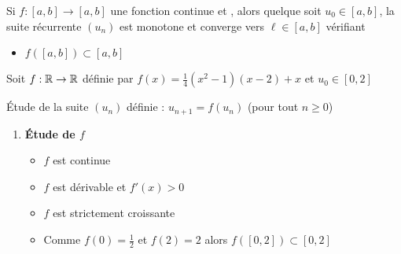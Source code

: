 \begin{frame}


\begin{proposition}
\label{prop:fcroissante}
Si $f : [a,b] \to [a,b]$ une fonction continue et , 
alors quelque soit $u_0 \in [a,b]$, la suite récurrente $(u_n)$ est
monotone et converge vers $\ell \in [a,b]$ vérifiant  
\end{proposition}

\pause
\medskip


\begin{minipage}{0.6\textwidth}
\begin{itemize}
  \item $f([a,b]) \subset [a,b]$
  \pause
{}
\end{itemize}  
\end{minipage}
\begin{minipage}{0.3\textwidth}
\end{minipage}


\end{frame}



\begin{frame}
\begin{exemple}
Soit $f : \mathbb{R} \to \mathbb{R}$ définie par $f(x)=\frac14(x^2-1)(x-2)+x$ et $u_0 \in [0,2]$

\'Etude de la suite $(u_n)$ définie : $u_{n+1}=f(u_n)$ (pour tout $n\ge0$)

\pause

\begin{enumerate}

  \item \textbf{\'Etude de $f$}
\pause  
  \begin{itemize}[<+->]
    \item $f$ est continue
    \item $f$ est dérivable et $f'(x)>0$
    \item $f$ est strictement croissante
    \item Comme $f(0)=\frac12$ et $f(2)=2$ alors $f([0,2]) \subset [0,2]$
  \end{itemize}
\end{enumerate}


\end{exemple}
\end{frame}


